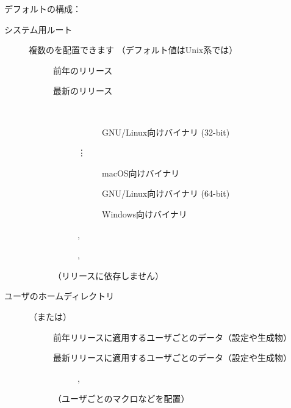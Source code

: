 \documentclass[uplatex,dvipdfmx,tombow]{jsarticle}
\begin{document}
\noindent
デフォルトの\TL 構成：
%
\begin{description}
\item[システム用ルート] 複数の\TL を配置できます
  （デフォルト値はUnix系では）
  \begin{description}
  \item[] 前年のリリース
  \item[] 最新のリリース
    \begin{description}
    \item[] ~
      \begin{description}
      \item[] GNU/Linux向けバイナリ (32-bit)
      \item[\quad\vdots]
      \item[] macOS向けバイナリ
      \item[] GNU/Linux向けバイナリ (64-bit)
      \item[] Windows向けバイナリ
      \end{description}
    \item[] , 
    \item[] , 
    \item[] 
    \end{description}
  \item[] （リリースに依存しません）
  \end{description}
\item[ユーザのホームディレクトリ] （または）
  \begin{description}
  \item[] 前年リリースに適用するユーザごとのデータ（設定や生成物）
  \item[] 最新リリースに適用するユーザごとのデータ（設定や生成物）
    \begin{description}
    \item[] , 
    \item[] 
    \end{description}
  \item[] （ユーザごとのマクロなどを配置）
  \end{description}
\end{description}
\end{document}
